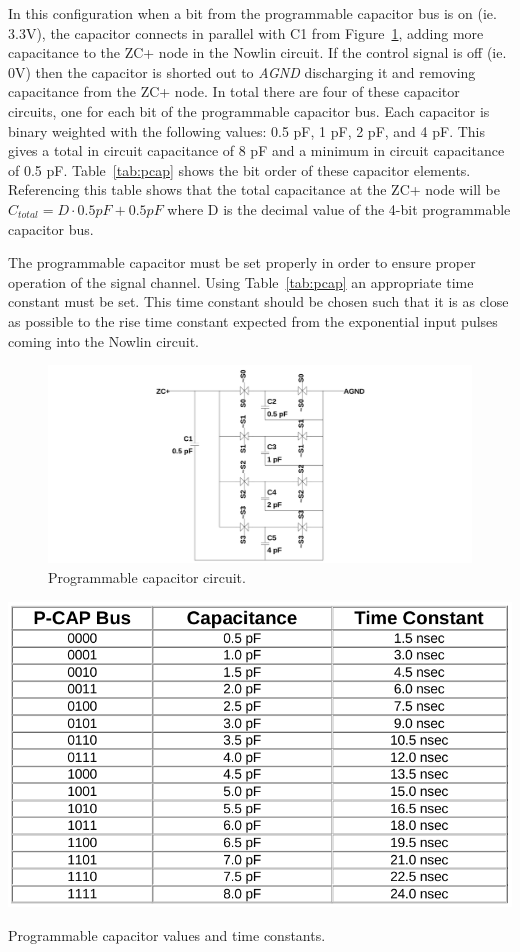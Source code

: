 \documentclass[12pt,oneside,final]{siuethesis}
\theoremstyle{definition}
\begin{document}
\par In this configuration when a bit from the programmable capacitor bus is on (ie. 3.3V), the capacitor connects in parallel with C1 from Figure~\ref{fig:pcap}, adding more capacitance to the ZC+ node in the Nowlin circuit. If the control signal is off (ie. 0V) then the capacitor is shorted out to \emph{AGND} discharging it and removing capacitance from the ZC+ node. In total there are four of these capacitor circuits, one for each bit of the programmable capacitor bus. Each capacitor is binary weighted with the following values: 0.5 pF, 1 pF, 2 pF, and 4 pF. This gives a total in circuit capacitance of 8 pF and a minimum in circuit capacitance of 0.5 pF. Table~\ref{tab:pcap} shows the bit order of these capacitor elements. Referencing this table shows that the total capacitance at the ZC+ node will be $C_{total} = D \cdot 0.5pF + 0.5pF$ where D is the decimal value of the 4-bit programmable capacitor bus.
\par The programmable capacitor must be set properly in order to ensure proper operation of the signal channel. Using Table~\ref{tab:pcap} an appropriate time constant must be set. This time constant should be chosen such that it is as close as possible to the rise time constant expected from the exponential input pulses coming into the Nowlin circuit.
\begin{figure}[ht]
\centering
\includegraphics[scale=.30,keepaspectratio=true]{../LTspice_Drawings/nowlin/pcap.png} 
\caption{Programmable capacitor circuit.}
\label{fig:pcap}
\end{figure}

\begin{table}[ht]
 \centering
 \includegraphics[scale=.5,keepaspectratio=true]{../data/pcap.png}
 \caption{Programmable capacitor values and time constants.}
 \label{tab:pcap}
\end{table}
\end{document}
